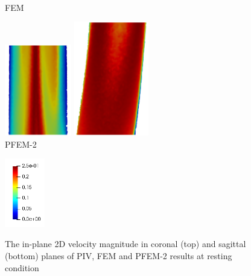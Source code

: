 \begin{figure}
\begin{minipage}[c][10cm][c]{0.25\textwidth}
\\FEM
\end{minipage}
\begin{minipage}[c][10cm][c]{0.25\textwidth}
\centering
\vspace*{\fill}
\includegraphics[height=4cm]{imgs/vena_cava/PFEM_coronal_exercise.png}
\includegraphics[height=5cm]{imgs/vena_cava/PFEM_sagittal_exercise.png}
\\PFEM-2
\end{minipage}
\begin{minipage}[c][10cm][t]{0.1\textwidth}
\vspace*{\fill}
\centering
\includegraphics[height=3cm]{imgs/vena_cava/colormap_exercise.png}
\\
\end{minipage}
\caption{The in-plane 2D velocity magnitude in coronal (top) and sagittal (bottom) planes of PIV, FEM and PFEM-2 results at resting condition}
\label{fig:exercise}
\end{figure}


